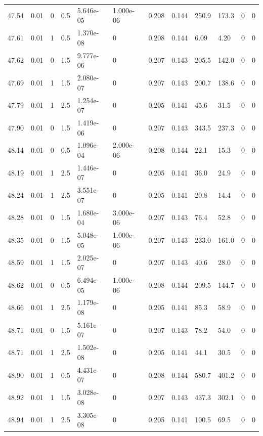 \documentclass[preview]{standalone}
\begin{document}
{{{{{{{{{{{{{{{\begin{tabular}{L{1.2cm}C{1.2cm} C{0.3cm}C{0.5cm} C{1.4cm}C{1.4cm} C{1.4cm}C{1.4cm} C{1.6cm}C{1.6cm} C{1.6cm}C{1.6cm}}
  47.54  &  0.01  & 0     & 0.5 &  5.646e-05  & 1.000e-06  &  0.208&   0.144& 250.9 & 173.3   &  0 & 0  \\ 
  47.61  &  0.01  & 1     & 0.5 &  1.370e-08  & 0  &  0.208&   0.144& 6.09 & 4.20   &  0 & 0  \\ 
  47.62  &  0.01  & 0     & 1.5 &  9.777e-06  & 0  &  0.207&   0.143& 205.5 & 142.0   &  0 & 0  \\ 
  47.69  &  0.01  & 1     & 1.5 &  2.080e-07  & 0  &  0.207&   0.143& 200.7 & 138.6   &  0 & 0  \\ 
  47.79  &  0.01  & 1     & 2.5 &  1.254e-07  & 0  &  0.205&   0.141& 45.6 & 31.5   &  0 & 0  \\ 
  47.90  &  0.01  & 0     & 1.5 &  1.419e-06  & 0  &  0.207&   0.143& 343.5 & 237.3   &  0 & 0  \\ 
  48.14  &  0.01  & 0     & 0.5 &  1.096e-04  & 2.000e-06  &  0.208&   0.144& 22.1 & 15.3   &  0 & 0  \\ 
  48.19  &  0.01  & 1     & 2.5 &  1.446e-07  & 0  &  0.205&   0.141& 36.0 & 24.9   &  0 & 0  \\ 
  48.24  &  0.01  & 1     & 2.5 &  3.551e-07  & 0  &  0.205&   0.141& 20.8 & 14.4   &  0 & 0  \\ 
  48.28  &  0.01  & 0     & 1.5 &  1.680e-04  & 3.000e-06  &  0.207&   0.143& 76.4 & 52.8   &  0 & 0  \\ 
  48.35  &  0.01  & 0     & 1.5 &  5.048e-05  & 1.000e-06  &  0.207&   0.143& 233.0 & 161.0   &  0 & 0  \\ 
  48.59  &  0.01  & 1     & 1.5 &  2.025e-07  & 0  &  0.207&   0.143& 40.6 & 28.0   &  0 & 0  \\ 
  48.62  &  0.01  & 0     & 0.5 &  6.494e-05  & 1.000e-06  &  0.208&   0.144& 209.5 & 144.7   &  0 & 0  \\ 
  48.66  &  0.01  & 1     & 2.5 &  1.179e-08  & 0  &  0.205&   0.141& 85.3 & 58.9   &  0 & 0  \\ 
  48.71  &  0.01  & 0     & 1.5 &  5.161e-07  & 0  &  0.207&   0.143& 78.2 & 54.0   &  0 & 0  \\ 
  48.71  &  0.01  & 1     & 2.5 &  1.502e-08  & 0  &  0.205&   0.141& 44.1 & 30.5   &  0 & 0  \\ 
  48.90  &  0.01  & 1     & 0.5 &  4.431e-07  & 0  &  0.208&   0.144& 580.7 & 401.2   &  0 & 0  \\ 
  48.92  &  0.01  & 1     & 1.5 &  3.028e-08  & 0  &  0.207&   0.143& 437.3 & 302.1   &  0 & 0  \\ 
  48.94  &  0.01  & 1     & 2.5 &  3.305e-08  & 0  &  0.205&   0.141& 100.5 & 69.5   &  0 & 0  \\ 

\end{tabular}}}}}}}}}}}}}}}}
\end{document}
